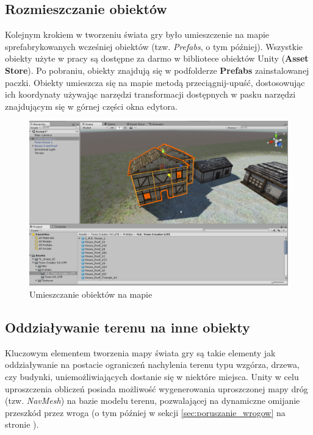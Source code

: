 \documentclass[openright]{xmgr}
\newcommand{\name}[1]{\textbf{\textcolor{NavyBlue}{#1}}}
\begin{document}
    \subsection{Rozmieszczanie obiektów}

        Kolejnym krokiem w tworzeniu świata gry było umieszczenie na mapie sprefabrykowanych wcześniej obiektów (tzw. \textit{Prefabs}, o tym później). Wszystkie obiekty użyte w pracy są dostępne za darmo w bibliotece obiektów Unity (\name{Asset Store}). Po pobraniu, obiekty znajdują się w podfolderze \name{Prefabs} zainstalowanej paczki. Obiekty umieszcza się na mapie metodą przeciągnij-upuść, dostosowując ich koordynaty używając narzędzi transformacji dostępnych w pasku narzędzi znajdującym się w górnej części okna edytora.

        \begin{figure}[H]
        \includegraphics[width=\textwidth]{teren_obiekty.png}
        \caption{Umieszczanie obiektów na mapie}
        \end{figure}


    \subsection{Oddziaływanie terenu na inne obiekty}

        Kluczowym elementem tworzenia mapy świata gry są takie elementy jak oddziaływanie na postacie ograniczeń nachylenia terenu typu wzgórza, drzewa, czy budynki, uniemożliwiających dostanie się w niektóre miejsca. Unity w celu uproszczenia obliczeń posiada możliwość wygenerowania uproszczonej mapy dróg (tzw. \textit{NavMesh}) na bazie modelu terenu, pozwalającej na dynamiczne omijanie przeszkód przez wroga (o tym później w sekcji \ref{sec:poruszanie_wrogow} na stronie \pageref{sec:poruszanie_wrogow}).
\end{document}
